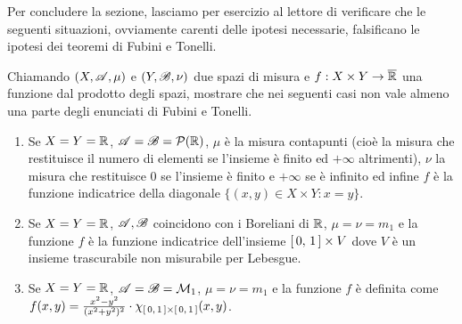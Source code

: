 Per concludere la sezione, lasciamo per esercizio al lettore di verificare che le seguenti situazioni, ovviamente carenti delle ipotesi necessarie, falsificano le ipotesi dei teoremi di Fubini e Tonelli.

\begin{exercise}\label{ex:ControesempiFubini}
	Chiamando $(X,\mathscr A,\mu)$ e $(Y,\mathscr B,\nu)$ due spazi di misura e $f:X\times Y\to \overline{\mathbb R}$ una funzione dal prodotto degli spazi, mostrare che nei seguenti casi non vale almeno una parte degli enunciati di Fubini e Tonelli.
	\begin{enumerate}
		\item Se $X=Y=\mathbb R$, $\mathscr A=\mathscr B=\mathcal P(\mathbb R)$, $\mu$ è la misura contapunti (cioè la misura che restituisce il numero di elementi se l'insieme è finito ed $+\infty$ altrimenti), $\nu$ la misura che restituisce $0$ se l'insieme è finito e $+\infty$ se è infinito ed infine $f$ è la funzione indicatrice della diagonale $\{(x,y)\in X\times Y: x=y\}$.
		\item Se $X=Y=\mathbb R$, $\mathscr A,\mathscr B$ coincidono con i Boreliani di $\mathbb R$, $\mu=\nu=m_1$ e la funzione $f$ è la funzione indicatrice dell'insieme $\left[\,0,\,1\,\right]\times V$ dove $V$ è un insieme trascurabile non misurabile per Lebesgue.
		\item Se $X=Y=\mathbb R$, $\mathscr A=\mathscr B=\mathcal M_1$, $\mu=\nu=m_1$ e la funzione $f$ è definita come $f(x,y)=\frac{x^2-y^2}{(x^2+y^2)^2}\cdot\chi_{\left[\,0,\,1\,\right]\times\left[\,0,\,1\,\right]}(x,y)$.
	\end{enumerate}

\end{exercise}

